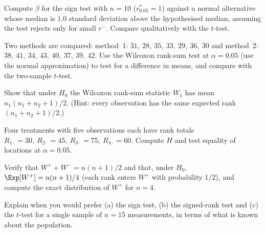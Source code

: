 \begin{exercise}
Compute $\beta$ for the sign test with $n=10$ ($r^*_{0.05}=1$) against a normal alternative whose median is $1.0$ standard deviation above the hypothesised median, assuming the test rejects only for small $r^-$. Compare qualitatively with the $t$-test.
\end{exercise}

\begin{exercise}
Two methods are compared: method~1: $31,\ 28,\ 35,\ 33,\ 29,\ 36,\ 30$ and method~2: $38,\ 41,\ 34,\ 43,\ 40,\ 37,\ 39,\ 42$. Use the Wilcoxon rank-sum test at $\alpha=0.05$ (use the normal approximation) to test for a difference in means, and compare with the two-sample $t$-test.
\end{exercise}

\begin{exercise}
Show that under $H_0$ the Wilcoxon rank-sum statistic $W_1$ has mean $n_1(n_1+n_2+1)/2$. (Hint: every observation has the same expected rank $(n_1+n_2+1)/2$.)
\end{exercise}

\begin{exercise}
Four treatments with five observations each have rank totals $R_{1\cdot}=30,\ R_{2\cdot}=45,\ R_{3\cdot}=75,\ R_{4\cdot}=60$. Compute $H$ and test equality of locations at $\alpha=0.05$.
\end{exercise}

\begin{exercise}
Verify that $W^++W^-=n(n+1)/2$ and that, under $H_0$, $\Exp[W^+]=n(n+1)/4$ (each rank enters $W^+$ with probability $1/2$), and compute the exact distribution of $W^+$ for $n=4$.
\end{exercise}

\begin{exercise}
Explain when you would prefer (a) the sign test, (b) the signed-rank test and (c) the $t$-test for a single sample of $n=15$ measurements, in terms of what is known about the population.
\end{exercise}
